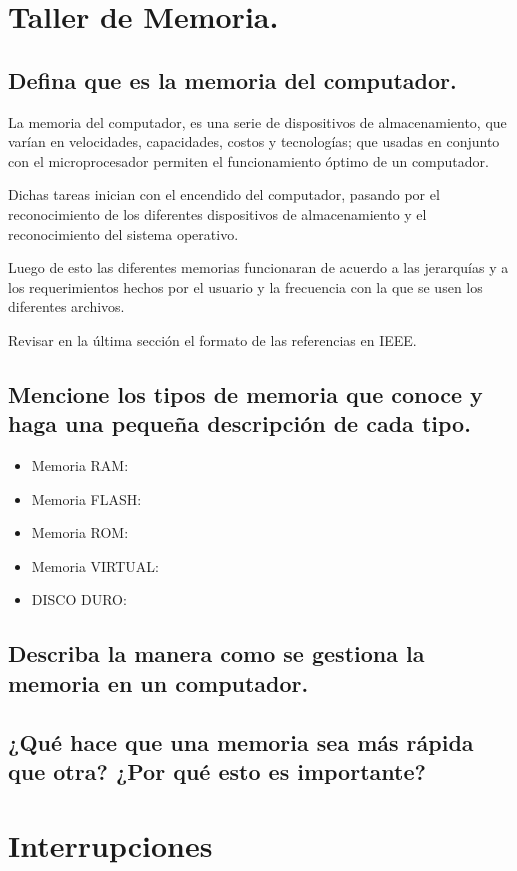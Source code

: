 \documentclass{article}
\begin{document}
\section{Taller de Memoria.} \label{contenido}

\subsection{Defina que es la memoria del computador.}
La memoria del computador, es una serie de dispositivos de almacenamiento, que varían en velocidades, capacidades, costos y tecnologías; que usadas en conjunto con el microprocesador permiten el funcionamiento óptimo de un computador. 

Dichas tareas inician con el encendido del computador, pasando por el reconocimiento de los diferentes dispositivos de almacenamiento y el reconocimiento del sistema operativo.

Luego de esto las diferentes memorias funcionaran de acuerdo a las jerarquías y a los requerimientos hechos por el usuario y la frecuencia con la que se usen los diferentes archivos. 


Revisar en la última sección el formato de las referencias en IEEE.

\subsection{Mencione los tipos de memoria que conoce y haga una pequeña descripción de cada tipo.}
\begin{itemize}
    \item     Memoria RAM:
    \item     Memoria FLASH:
    \item     Memoria ROM:
    \item     Memoria VIRTUAL:
    \item     DISCO DURO:
\end{itemize}

\subsection{Describa la manera como se gestiona la memoria en un computador.}

\subsection{¿Qué hace que una memoria sea más rápida que otra? ¿Por qué esto es importante?}
\newpage
\section{Interrupciones} \label{contenido}
\newpage
\end{document}

